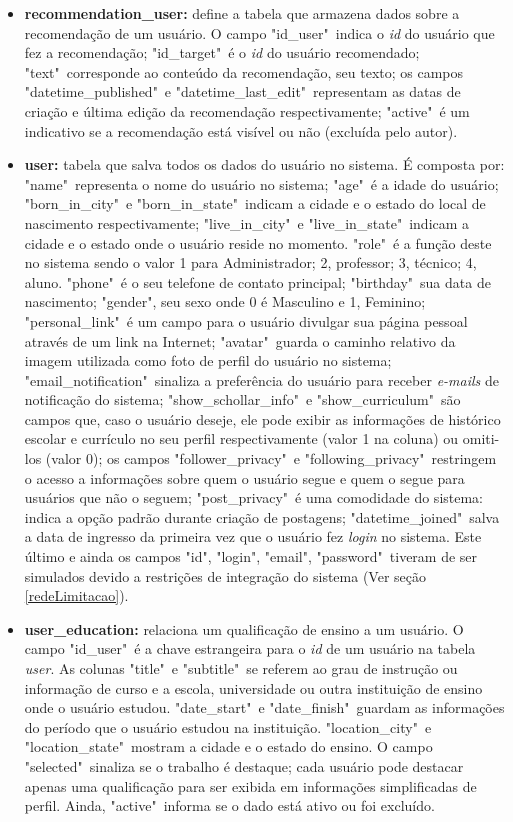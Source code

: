 \begin{itemize}
    \item \textbf{recommendation\_user:} define a tabela que armazena dados sobre a recomendação de um usuário. O campo "id\_user"\ indica o \textit{id} do usuário que fez a recomendação; "id\_target"\ é o \textit{id} do usuário recomendado; "text"\ corresponde ao conteúdo da recomendação, seu texto; os campos "datetime\_published"\ e "datetime\_last\_edit"\ representam as datas de criação e última edição da recomendação respectivamente; "active"\ é um indicativo se a recomendação está visível ou não (excluída pelo autor).
    
    \item \textbf{user:} tabela que salva todos os dados do usuário no sistema. É composta por: "name"\ representa o nome do usuário no sistema; "age"\ é a idade do usuário; "born\_in\_city"\ e "born\_in\_state"\ indicam a cidade e o estado do local de nascimento respectivamente; "live\_in\_city"\ e "live\_in\_state"\ indicam a cidade e o estado onde o usuário reside no momento. "role"\ é a função deste no sistema sendo o valor 1 para Administrador; 2, professor; 3, técnico; 4, aluno. "phone"\ é o seu telefone de contato principal; "birthday"\ sua data de nascimento; "gender", seu sexo onde 0 é Masculino e 1, Feminino; "personal\_link"\ é um campo para o usuário divulgar sua página pessoal através de um link na Internet; "avatar"\ guarda o caminho relativo da imagem utilizada como foto de perfil do usuário no sistema; "email\_notification"\ sinaliza a preferência do usuário para receber \textit{e-mails} de notificação do sistema; "show\_schollar\_info"\ e "show\_curriculum"\ são campos que, caso o usuário deseje, ele pode exibir as informações de histórico escolar e currículo no seu perfil respectivamente (valor 1 na coluna) ou omiti-los (valor 0); os campos "follower\_privacy"\ e "following\_privacy"\ restringem o acesso a informações sobre quem o usuário segue e quem o segue para usuários que não o seguem; "post\_privacy"\ é uma comodidade do sistema: indica a opção padrão durante criação de postagens; "datetime\_joined"\ salva a data de ingresso da primeira vez que o usuário fez \textit{login} no sistema. Este último e ainda os campos "id", "login", "email", "password"\ tiveram de ser simulados devido a restrições de integração do sistema (Ver seção \ref{redeLimitacao}).
    
    \item \textbf{user\_education:} relaciona um qualificação de ensino a um usuário. O campo "id\_user"\ é a chave estrangeira para o \textit{id} de um usuário na tabela \textit{user}. As colunas "title"\ e "subtitle"\ se referem ao grau de instrução ou informação de curso e a escola, universidade ou outra instituição de ensino onde o usuário estudou. "date\_start"\ e "date\_finish"\ guardam as informações do período que o usuário estudou na instituição. "location\_city"\ e "location\_state"\ mostram a cidade e o estado do ensino. O campo "selected"\ sinaliza se o trabalho é destaque; cada usuário pode destacar apenas uma qualificação para ser exibida em informações simplificadas de perfil. Ainda, "active"\ informa se o dado está ativo ou foi excluído.
    

\end{itemize}
